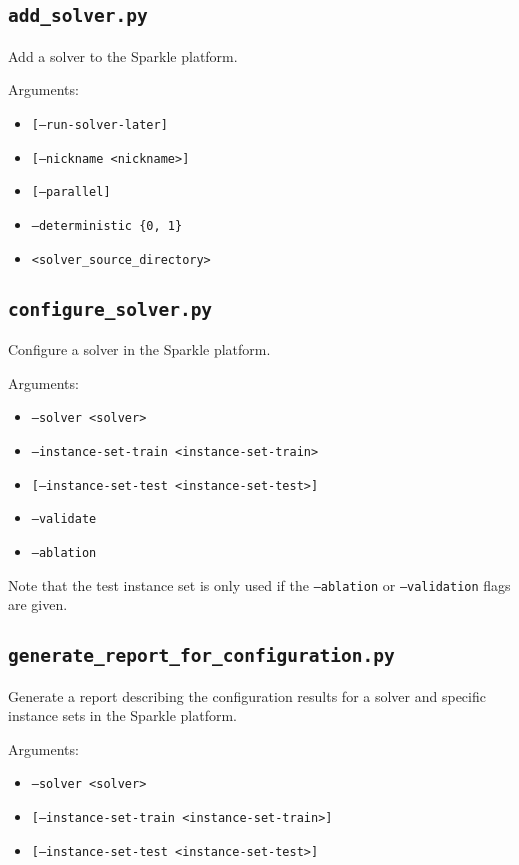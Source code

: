 \documentclass{article}
\begin{document}
\subsection{\texttt{add\_solver.py}}
\label{cmd:add_solver}
Add a solver to the Sparkle platform.

Arguments:
\begin{itemize}[noitemsep]
  \item[] \texttt{[--run-solver-later]}
  \item[] \texttt{[--nickname <nickname>]}
  \item[] \texttt{[--parallel]}
  \item[] \texttt{--deterministic \{0, 1\}}
  \item[] \texttt{<solver\_source\_directory>}
\end{itemize}

\subsection{\texttt{configure\_solver.py}}
\label{cmd:configure_solver}
Configure a solver in the Sparkle platform.

Arguments:
\begin{itemize}[noitemsep]
  \item[] \texttt{--solver <solver>}
  \item[] \texttt{--instance-set-train <instance-set-train>}
  \item[] \texttt{[--instance-set-test <instance-set-test>]}
  \item[] \texttt{--validate}
  \item[] \texttt{--ablation}
\end{itemize}

Note that the test instance set is only used if the \texttt{--ablation} or \texttt{--validation} flags are given.

\subsection{\texttt{generate\_report\_for\_configuration.py}}
\label{cmd:generate_report_for_configuration}
Generate a report describing the configuration results for a solver and specific instance sets in the Sparkle platform.

Arguments:
\begin{itemize}[noitemsep]
  \item[] \texttt{--solver <solver>}
  \item[] \texttt{[--instance-set-train <instance-set-train>]}
  \item[] \texttt{[--instance-set-test <instance-set-test>]}
\end{itemize}
\end{document}
